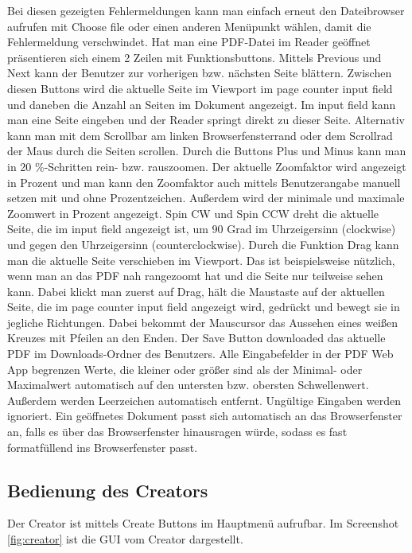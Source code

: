 Bei diesen gezeigten Fehlermeldungen kann man einfach erneut den Dateibrowser aufrufen mit Choose file oder einen anderen Menüpunkt wählen, damit die Fehlermeldung verschwindet. Hat man eine PDF-Datei im Reader geöffnet präsentieren sich einem 2 Zeilen mit Funktionsbuttons. Mittels Previous und Next kann der Benutzer zur vorherigen bzw. nächsten Seite blättern. Zwischen diesen Buttons wird die aktuelle Seite im Viewport im page counter input field und daneben die Anzahl an Seiten im Dokument angezeigt. Im input field kann man eine Seite eingeben und der Reader springt direkt zu dieser Seite. Alternativ kann man mit dem Scrollbar am linken Browserfensterrand oder dem Scrollrad der Maus durch die Seiten scrollen. Durch die Buttons Plus und Minus kann man in 20 \%-Schritten rein- bzw. rauszoomen. Der aktuelle Zoomfaktor wird angezeigt in Prozent und man kann den Zoomfaktor auch mittels Benutzerangabe manuell setzen mit und ohne Prozentzeichen. Außerdem wird der minimale und maximale Zoomwert in Prozent angezeigt. Spin CW und Spin CCW dreht die aktuelle Seite, die im input field angezeigt ist, um 90 Grad im Uhrzeigersinn (clockwise) und gegen den Uhrzeigersinn (counterclockwise). Durch die Funktion Drag kann man die aktuelle Seite verschieben im Viewport. Das ist beispielsweise nützlich, wenn man an das PDF nah rangezoomt hat und die Seite nur teilweise sehen kann. Dabei klickt man zuerst auf Drag, hält die Maustaste auf der aktuellen Seite, die im page counter input field angezeigt wird, gedrückt und bewegt sie in jegliche Richtungen. Dabei bekommt der Mauscursor das Aussehen eines weißen Kreuzes mit Pfeilen an den Enden. Der Save Button downloaded das aktuelle PDF im Downloads-Ordner des Benutzers. Alle Eingabefelder in der PDF Web App begrenzen Werte, die kleiner oder größer sind als der Minimal- oder Maximalwert automatisch auf den untersten bzw. obersten Schwellenwert. Außerdem werden Leerzeichen automatisch entfernt. Ungültige Eingaben werden ignoriert. Ein geöffnetes Dokument passt sich automatisch an das Browserfenster an, falls es über das Browserfenster hinausragen würde, sodass es fast formatfüllend ins Browserfenster passt. \\

\subsection{Bedienung des Creators}
Der Creator ist mittels Create Buttons im Hauptmenü aufrufbar. Im Screenshot \ref{fig:creator} ist die GUI vom Creator dargestellt. 

